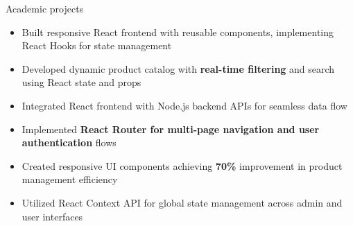 \documentclass{resume}
\begin{document}

    \vspace{0.5em}
    \begin{experienceSection}{Academic projects}

    \projectItem[
        title=Beyond Product: E-Commerce Platform,
        keyHighlight={\textbf{Role}: Full-Stack Developer\\
        \textbf{Tech Stack:} ReactJS, Node.js, Express.js, MongoDB, Stripe API, Morgan}
        ]
    \begin{itemize}
        \vspace{-0.5em}
        \itemsep -6pt {}
        \item Built responsive React frontend with reusable components, implementing React Hooks for state management
        \item Developed dynamic product catalog with \textbf{real-time filtering} and search using React state and props
        \item Integrated React frontend with Node.js backend APIs for seamless data flow
        \item Implemented \textbf{React Router for multi-page navigation and user authentication} flows
        \item Created responsive UI components achieving \textbf{70\%} improvement in product management efficiency
        \item  Utilized React Context API for global state management across admin and user interfaces
    \end{itemize}

    \end{experienceSection}

\end{document}
